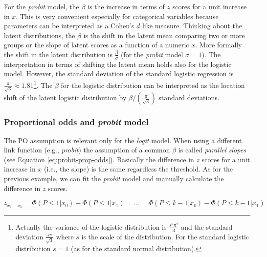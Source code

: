 \documentclass[
  man,floatsintext]{apa6}
\begin{document}
For the \emph{probit} model, the \(\beta\) is the increase in terms of \(z\) scores for a unit increase in \(x\). This is very convenient especially for categorical variables because parameters can be interpreted as a Cohen's \(d\) like measure. Thinking about the latent distributions, the \(\beta\) is the shift in the latent mean comparing two or more groups or the slope of latent scores as a function of a numeric \(x\). More formally the shift in the latent distribution is \(\frac{\beta}{\sigma}\) (for the \emph{probit} model \(\sigma = 1\)). The interpretation in terms of shifting the latent mean holds also for the logistic model. However, the standard deviation of the standard logistic regression is \(\frac{\pi}{\sqrt{3}} \approx 1.81\)\footnote{Actually the variance of the logistic distribution is \(\frac{s^2\pi^2}{3}\) and the standard deviation \(\frac{s\pi}{\sqrt{3}}\) where \(s\) is the scale of the distribution. For the standard logistic distribution \(s = 1\) (as for the standard normal distribution).}. The \(\beta\) for the logistic distribution can be interpreted as the location shift of the latent logistic distribution by \(\beta/(\frac{\pi}{\sqrt{3}})\) standard deviations.

\subsubsection{\texorpdfstring{Proportional odds and \emph{probit} model}{Proportional odds and probit model}}\label{proportional-odds-and-probit-model}

The PO assumption is relevant only for the \emph{logit} model. When using a different link function (e.g., \emph{probit}) the assumption of a common \(\beta\) is called \emph{parallel slopes} (see Equation \eqref{eq:probit-prop-odds}). Basically the difference in \(z\) scores for a unit increase in \(x\) (i.e., the slope) is the same regardless the threshold. As for the previous example, we can fit the \emph{probit} model and manually calculate the difference in \(z\) scores.

\begin{equation}
z_{x_1 - x_0} = \Phi(P \leq 1|x_0) - \Phi(P \leq 1|x_1) = \dots = \Phi(P \leq k - 1|x_0) - \Phi(P \leq k - 1|x_1)
\label{eq:probit-prop-odds}
\end{equation}

\scriptsize
\end{document}
